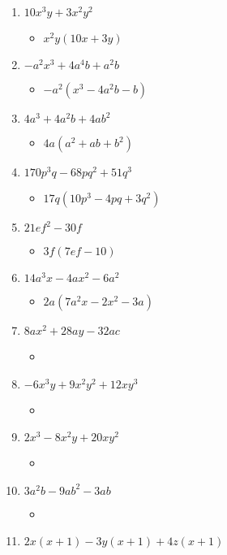 \documentclass{article}
\begin{document}
\begin{enumerate}
\item $10x^{3}y + 3x^{2}y^{2}$
  \begin{itemize}
  \item $x^{2}y(10x+3y)$
  \end{itemize}
\item $-a^{2}x^{3} + 4a^{4}b + a^{2}b$
  \begin{itemize}
  \item $-a^{2}(x^{3}-4a^{2}b-b)$
  \end{itemize}
\item $4a^{3} + 4a^{2}b + 4ab^{2}$
  \begin{itemize}
  \item $4a(a^{2}+ab+b^{2})$
  \end{itemize}
\item $170p^{3}q - 68pq^{2} + 51q^{3}$
  \begin{itemize}
  \item $17q(10p^{3}-4pq+3q^{2})$
  \end{itemize}
\item $21ef^{2} - 30f$
  \begin{itemize}
  \item $3f(7ef-10)$
  \end{itemize}
\item $14a^{3}x - 4ax^{2} - 6a^{2}$
  \begin{itemize}
  \item $2a(7a^{2}x-2x^{2}-3a)$
  \end{itemize}
\item $8ax^{2} + 28ay - 32ac$
  \begin{itemize}
  \item 
  \end{itemize}
\item $-6x^{3}y + 9x^{2}y^{2} + 12xy^{3}$
  \begin{itemize}
  \item 
  \end{itemize}
\item $2x^{3} - 8x^{2}y + 20xy^{2}$
  \begin{itemize}
  \item 
  \end{itemize}
\item $3a^{2}b - 9ab^{2} - 3ab$
  \begin{itemize}
  \item 
  \end{itemize}
\item $2x(x+1) - 3y(x+1) + 4z(x+1)$
  \begin{itemize}

\end{itemize}
\end{enumerate}
\end{document}
